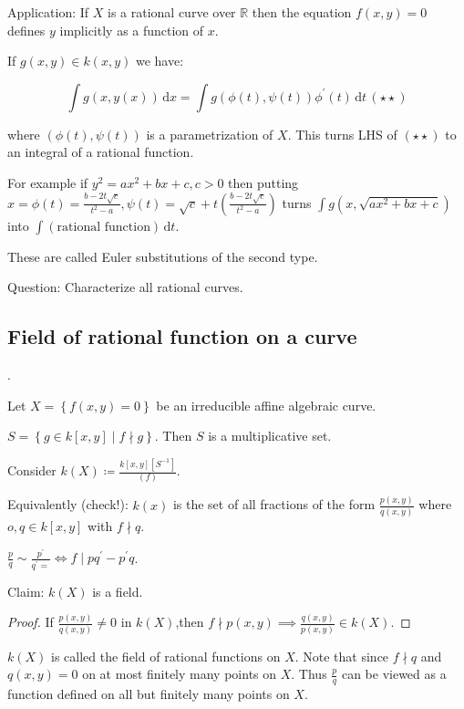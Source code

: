 \documentclass{article}
\theoremstyle{definition}
\begin{document}
    Application: If \(X\) is a rational curve over \(\mathbb{R}\) then the equation \(f(x,y)=0\) defines \(y\) implicitly as a function of \(x\).

    If \(g(x,y)\in k(x,y)\) we have:

    \[
        \int g(x,y(x))\,\mathrm{d}x = \int g(\phi(t),\psi(t))\phi^{\prime}(t)\, \mathrm{d}t \, (\star\star)
    \]

    where \((\phi(t),\psi(t))\) is a parametrization of \(X\). This turns LHS of \((\star\star)\) to an integral of a rational function.

    For example if \(y^2 = ax^2 + bx + c, c > 0\) then putting \(x = \phi(t) = \frac{b-2t\sqrt{c}}{t^2 - a}, \psi(t) = \sqrt{c} + t \left( \frac{b - 2t \sqrt{c}}{t^2 - a} \right)\) turns \(\int g(x, \sqrt{ax^2 + bx + c})\) into \(\int (\text{rational function})\, \mathrm{d}t\).

    These are called Euler substitutions of the second type.

    Question: Characterize all rational curves.

    \subsection*{Field of rational function on a curve}.

    Let \(X = \left\{ f(x,y) = 0 \right\} \) be an irreducible affine algebraic curve.

    \(S = \left\{ g \in k[x,y] \mid f \nmid g \right\}\). Then \(S\) is a multiplicative set.

    Consider \(k(X) \coloneqq \frac{k[x,y][S ^{-1}]}{(f)}\).

    Equivalently (check!): \(k(x)\) is the set of all fractions of the form \(\frac{p(x,y)}{q(x,y)}\) where \(o,q\in k[x,y]\) with \(f\nmid q\).
    
    \(\frac{p}{q} \sim \frac{p^{\prime}}{q^{\prime} =} \iff f \mid pq^{\prime} -p^{\prime} q\). 

    Claim: \(k(X)\) is a field.

    \begin{proof}
        If \(\frac{p(x,y)}{q(x,y)}\neq 0\) in \(k(X)\),then \(f \nmid p(x,y) \implies \frac{q(x,y)}{p(x,y)}\in k(X) \).
    \end{proof}

    \(k(X)\) is called the field of rational functions on \(X\). Note that since \(f\nmid q\) and \(q(x,y)=0\) on at most finitely many points on \(X\). Thus \(\frac{p}{q}\) can be viewed as a function defined on all but finitely many points on \(X\).
\end{document}
